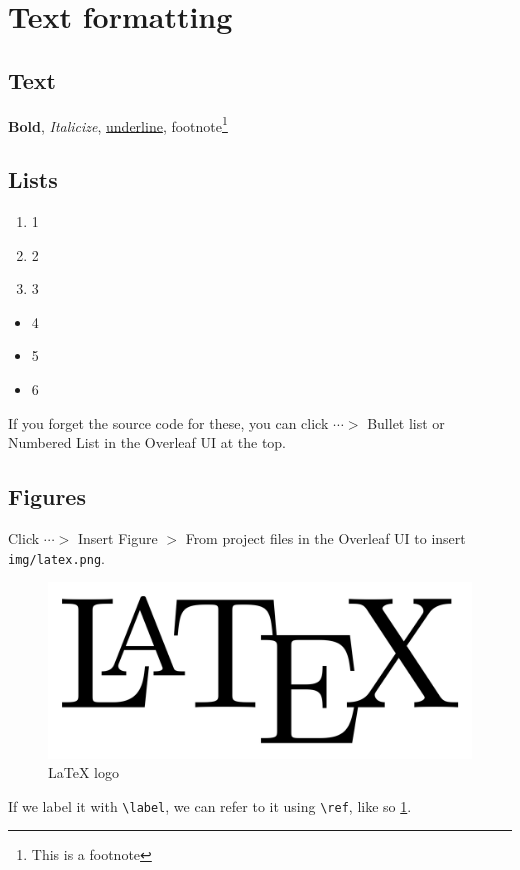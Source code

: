 \documentclass{article}
\begin{document}
\section{Text formatting}

\subsection{Text}

\textbf{Bold}, \textit{Italicize}, \underline{underline}, footnote\footnote{This is a footnote}

\subsection{Lists}

\begin{enumerate}
    \item 1
    \item 2
    \item 3
\end{enumerate}

\begin{itemize}
    \item 4
    \item 5
    \item 6
\end{itemize}

If you forget the source code for these, you can click $\cdots >$ Bullet list or Numbered List in the Overleaf UI at the top.

\subsection{Figures}

Click $\cdots >$ Insert Figure $>$ From project files in the Overleaf UI to insert \texttt{img/latex.png}.

\begin{figure}[h]
    \centering
    \includegraphics[width=0.6\linewidth]{img/latex.png}
    \caption{\LaTeX{} logo}
    \label{latex_logo}
\end{figure}

If we label it with \texttt{\textbackslash label}, we can refer to it using \texttt{\textbackslash ref}, like so \ref{latex_logo}.
\end{document}
